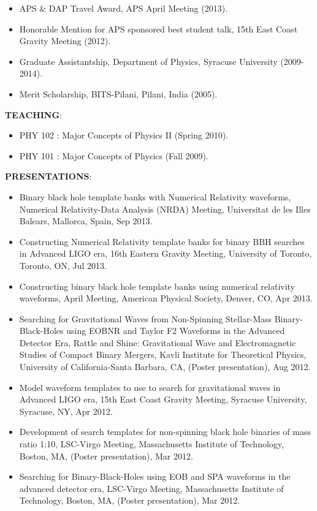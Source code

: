 \begin{itemize}
\item APS \& DAP Travel Award, APS April Meeting (2013).
\item Honorable Mention for APS sponsored best student talk, 15th East Coast Gravity Meeting (2012).
\item Graduate Assistantship, Department of Physics, Syracuse University (2009-2014).
\item Merit Scholarship, BITS-Pilani, Pilani, India (2005).
\end{itemize}
{\bf TEACHING}:
\begin{itemize}
\item PHY 102 : Major Concepts of Physics II (Spring 2010).
\item PHY 101 : Major Concepts of Physics (Fall 2009).
\end{itemize}
{\bf PRESENTATIONS}:
\begin{itemize}
\item Binary black hole template banks with Numerical Relativity waveforms, Numerical Relativity-Data Analysis (NRDA) Meeting, Universitat de les Illes Balears, Mallorca, Spain, Sep 2013.
\item Constructing Numerical Relativity template banks for binary BBH searches in Advanced LIGO era, 16th Eastern Gravity Meeting, University of Toronto, Toronto, ON, Jul 2013.
\item Constructing binary black hole template banks using numerical relativity waveforms, April Meeting, American Physical Society, Denver, CO, Apr 2013.
\item Searching for Gravitational Waves from Non-Spinning Stellar-Mass Binary-Black-Holes using EOBNR and Taylor F2 Waveforms in the Advanced Detector Era, Rattle and Shine: Gravitational Wave and Electromagnetic Studies of Compact Binary Mergers, Kavli Institute for Theoretical Physics, University of California-Santa Barbara, CA, (Poster presentation), Aug 2012.
\item Model waveform templates to use to search for gravitational waves in Advanced LIGO era, 15th East Coast Gravity Meeting, Syracuse University, Syracuse, NY, Apr 2012.
\item Development of search templates for non-spinning black hole binaries of mass ratio 1:10, LSC-Virgo Meeting, Massachusetts Institute of Technology, Boston, MA, (Poster presentation), Mar 2012.
\item Searching for Binary-Black-Holes using EOB and SPA waveforms in the advanced detector era, LSC-Virgo Meeting, Massachusetts Institute of Technology, Boston, MA, (Poster presentation), Mar 2012.
\end{itemize}
